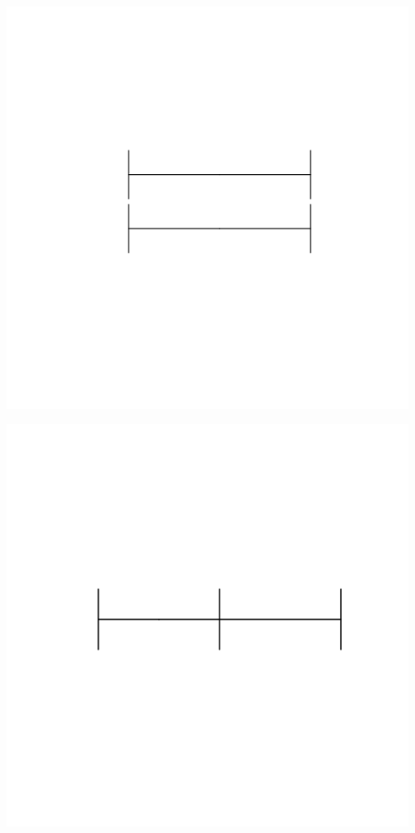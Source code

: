 \documentclass[
]{book}
\begin{document}
\begin{center}\includegraphics[width=6.67in,height=0.25\textheight]{imgs/some} \end{center}

\begin{center}\includegraphics[width=6.67in,height=0.25\textheight]{imgs/some2} \end{center}
\end{document}
